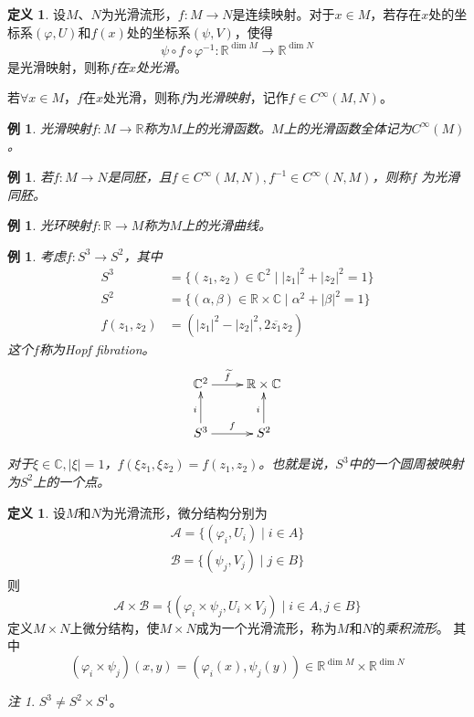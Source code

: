 \documentclass[winfonts,UTF8,c5size,a4paper,fancyhdr,hyperref,titlepage,nocap]{ctexart}
\newtheorem{exa}[thm]{例}
\theoremstyle{definition}
\newtheorem{defn}[thm]{定义}
\theoremstyle{remark}
\newtheorem*{rem}{注}
\numberwithin{equation}{subsection}
\newcommand{\Real}{\mathbb{R}}
\newcommand{\Complex}{\mathbb{C}}
\newcommand{\red}{\color{red}}
\begin{document}
\begin{defn}
  设$M$、$N$为光滑流形，$f\colon M\to N$是连续映射。对于$x\in M$，若存在$x$处的坐标系$(\varphi,U)$和$f(x)$处的坐标系$(\psi,V)$，使得
  \begin{equation*}
  \psi\circ f\circ\varphi^{-1}\colon\Real^{\dim M}\longrightarrow\Real^{\dim N}
  \end{equation*}
  是光滑映射，则称$f$\emph{\red 在$x$处光滑}。

  若$\forall x\in M$，$f$在$x$处光滑，则称$f$为\emph{\red 光滑映射}，记作$f\in C^{\infty}(M,N)$。
\end{defn}
\begin{exa}
  光滑映射$f\colon M\to\Real$称为$M$上的{\red 光滑函数}。$M$上的光滑函数全体记为$C^{\infty}(M)$。
\end{exa}
\begin{exa}
  若$f\colon M\to N$是同胚，且$f\in C^{\infty}(M,N),f^{-1}\in C^{\infty}(N,M)$，则称$f$ 为{\red 光滑同胚}。
\end{exa}
\begin{exa}
  光环映射$f\colon\Real\to M$称为$M$上的{\red 光滑曲线}。
\end{exa}
\begin{exa}
  考虑$f\colon S^3\to S^2$，其中
  \begin{align*}
  S^3&=\{(z_1,z_2)\in\Complex^2\mid|z_1|^2+|z_2|^2=1\} \\
  S^2&=\{(\alpha,\beta)\in\Real\times\Complex\mid\alpha^2+|\beta|^2=1\} \\
  f(z_1,z_2)&=(|z_1|^2-|z_2|^2,2\overline{z_1}z_2)
  \end{align*}
  这个$f$称为{\red Hopf fibration}。
\begin{displaymath}
      \xymatrix{
        \Complex^2\ar[r]^-{\widetilde{f}}&\Real\times\Complex\\
        S^3\ar[r]^{f}\ar[u]^{i}&S^2\ar[u]^{i}
      }
\end{displaymath}

对于$\xi\in\Complex,|\xi|=1$，$f(\xi z_1,\xi z_2)=f(z_1,z_2)$。也就是说，$S^3$中的一个圆周被映射为$S^2$上的一个点。
\end{exa}
\begin{defn}
  设$M$和$N$为光滑流形，微分结构分别为
\begin{gather*}
\mathscr{A}=\{(\varphi_i,U_i)\mid i\in A\}\\
\mathscr{B}=\{(\psi_j,V_j)\mid j\in B\}
\end{gather*}
则
\begin{equation*}
\mathscr{A}\times\mathscr{B}=\{(\varphi_i\times\psi_j,U_i\times V_j)\mid i\in A, j\in B\}
\end{equation*}
定义$M\times N$上微分结构，使$M\times N$成为一个光滑流形，称为$M$和$N$的\emph{\red 乘积流形}。
其中
\begin{equation*}
(\varphi_i\times\psi_j)(x,y)=(\varphi_i(x),\psi_j(y))\in\Real^{\dim M}\times\Real^{\dim N}
\end{equation*}
\end{defn}
\begin{rem}
  $S^3\neq S^2\times S^1$。
\end{rem}
\end{document}
